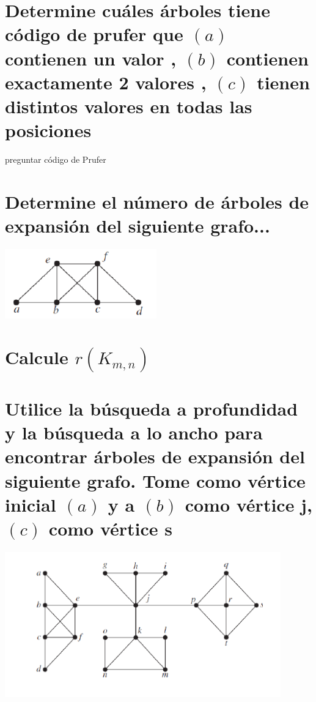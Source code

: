\documentclass[10pt,a4paper]{article} %
\begin{document}


    \section{Determine cuáles árboles tiene código de prufer que $(a)$
    contienen un valor , $(b)$ contienen exactamente 2 valores , $(c)$ tienen
    distintos valores en todas las posiciones}
        \color{red} preguntar código de Prufer  \color{black}




    \section{Determine el número de árboles de expansión del siguiente grafo...}
       \begin{center}
            \includegraphics[width=0.5\linewidth]{grafop7.png}
       \end{center}





   \section{Calcule $ r(K_{m,n})$}




   \section{Utilice la búsqueda a profundidad y la búsqueda a lo ancho para
   encontrar árboles de expansión del siguiente grafo. Tome como vértice
   inicial $(a)$ y a $(b)$ como vértice  j, $(c)$ como vértice s}
       \begin{center}
       \includegraphics[width=0.5\linewidth]{grafop9.png}
       \end{center}
\end{document}
